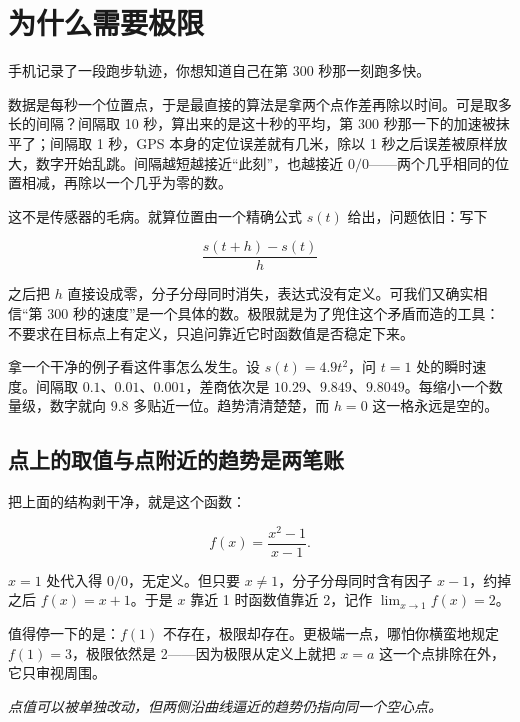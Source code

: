 \section{为什么需要极限}
\label{sec:02-Calculus/02-Limits-and-Continuity/01}

手机记录了一段跑步轨迹，你想知道自己在第 300 秒那一刻跑多快。

数据是每秒一个位置点，于是最直接的算法是拿两个点作差再除以时间。可是取多长的间隔？间隔取 10 秒，算出来的是这十秒的平均，第 300 秒那一下的加速被抹平了；间隔取 1 秒，GPS 本身的定位误差就有几米，除以 1 秒之后误差被原样放大，数字开始乱跳。间隔越短越接近``此刻''，也越接近 \(0/0\)——两个几乎相同的位置相减，再除以一个几乎为零的数。

这不是传感器的毛病。就算位置由一个精确公式 \(s(t)\) 给出，问题依旧：写下

\[
\frac{s(t+h)-s(t)}{h}
\]

之后把 \(h\) 直接设成零，分子分母同时消失，表达式没有定义。可我们又确实相信``第 300 秒的速度''是一个具体的数。极限就是为了兜住这个矛盾而造的工具：不要求在目标点上有定义，只追问靠近它时函数值是否稳定下来。

拿一个干净的例子看这件事怎么发生。设 \(s(t)=4.9t^2\)，问 \(t=1\) 处的瞬时速度。间隔取 \(0.1\)、\(0.01\)、\(0.001\)，差商依次是 \(10.29\)、\(9.849\)、\(9.8049\)。每缩小一个数量级，数字就向 \(9.8\) 多贴近一位。趋势清清楚楚，而 \(h=0\) 这一格永远是空的。

\subsection{点上的取值与点附近的趋势是两笔账}

把上面的结构剥干净，就是这个函数：

\[
f(x)=\frac{x^2-1}{x-1}.
\]

\(x=1\) 处代入得 \(0/0\)，无定义。但只要 \(x\neq1\)，分子分母同时含有因子 \(x-1\)，约掉之后 \(f(x)=x+1\)。于是 \(x\) 靠近 1 时函数值靠近 2，记作 \(\lim_{x\to1}f(x)=2\)。

值得停一下的是：\(f(1)\) 不存在，极限却存在。更极端一点，哪怕你横蛮地规定 \(f(1)=3\)，极限依然是 2——因为极限从定义上就把 \(x=a\) 这一个点排除在外，它只审视周围。

\begin{center}

\emph{点值可以被单独改动，但两侧沿曲线逼近的趋势仍指向同一个空心点。}
\end{center}

